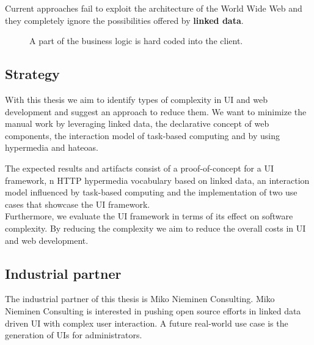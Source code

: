 Current approaches fail to exploit the architecture of the World Wide Web and they completely ignore the possibilities offered by \textbf{linked data}.

\begin{figure}[!htb]
  \caption{A part of the business logic is hard coded into the client.}
  \label{fig:hardcoded}
\end{figure}

\subsection{Strategy}\label{strategy}
With this thesis we aim to identify types of complexity in UI and web development and suggest an approach to reduce them.
We want to minimize the manual work by leveraging linked data, the declarative concept of web components, the interaction model of task-based computing and by using \gls{hypermedia} and \gls{hateoas}.

The expected results and artifacts consist of a proof-of-concept for a UI framework, n HTTP \gls{hypermedia} vocabulary based on linked data, an interaction model influenced by task-based computing and the implementation of two use cases that showcase the UI framework. \\
Furthermore, we evaluate the UI framework in terms of its effect on software complexity. By reducing the complexity we aim to reduce the overall costs in UI and web development.

\subsection{Industrial partner}
The industrial partner of this thesis is Miko Nieminen Consulting. Miko Nieminen Consulting is interested in pushing open source efforts in linked data driven UI with complex user interaction. A future real-world use case is the generation of UIs for administrators.
